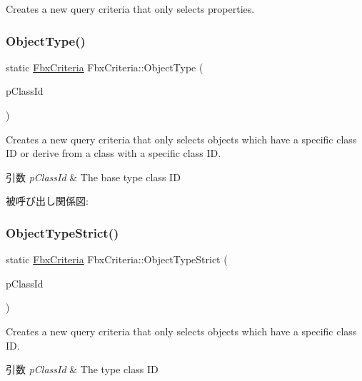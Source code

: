 Creates a new query criteria that only selects properties. 

\mbox{\label{class_fbx_criteria_a760d66022a8febcd3fd0c5fbbb534023}} 
\subsubsection{\texorpdfstring{Object\+Type()}{ObjectType()}}
{\footnotesize\ttfamily static \hyperlink{class_fbx_criteria}{Fbx\+Criteria} Fbx\+Criteria\+::\+Object\+Type (\begin{DoxyParamCaption}\item[{const \hyperlink{class_fbx_class_id}{Fbx\+Class\+Id} \&}]{p\+Class\+Id }\end{DoxyParamCaption})\hspace{0.3cm}{\ttfamily [static]}}

Creates a new query criteria that only selects objects which have a specific class ID or derive from a class with a specific class ID. 
\begin{DoxyParams}{引数}
{\em p\+Class\+Id} & The base type class ID \\
\hline
\end{DoxyParams}
被呼び出し関係図\+:
\mbox{\label{class_fbx_criteria_a38bc13d95aaea852252625ca084054dd}} 
\subsubsection{\texorpdfstring{Object\+Type\+Strict()}{ObjectTypeStrict()}}
{\footnotesize\ttfamily static \hyperlink{class_fbx_criteria}{Fbx\+Criteria} Fbx\+Criteria\+::\+Object\+Type\+Strict (\begin{DoxyParamCaption}\item[{const \hyperlink{class_fbx_class_id}{Fbx\+Class\+Id} \&}]{p\+Class\+Id }\end{DoxyParamCaption})\hspace{0.3cm}{\ttfamily [static]}}

Creates a new query criteria that only selects objects which have a specific class ID. 
\begin{DoxyParams}{引数}
{\em p\+Class\+Id} & The type class ID \\
\hline
\end{DoxyParams}
\mbox{\label{class_fbx_criteria_a413bfdd843fa25e6ff94f942b25114f9}} 
